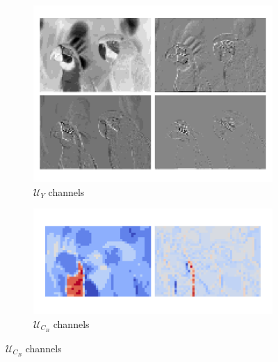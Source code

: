 \begin{figure}[t]
    \centering
    \begin{minipage}{0.41\textwidth}
        \begin{subfigure}{\textwidth}
            \centering
            \includegraphics[width=.95\textwidth]{figures/kodim23_Y_components.pdf}
            \vspace{-13pt}
            \caption{$\bm{\mathcal{U}}_Y$ channels}
        \end{subfigure}%
    \end{minipage}
    \hspace{0.1cm} 
    \begin{minipage}{0.35\textwidth}
        \centering
        \begin{minipage}{\textwidth}
            \begin{subfigure}{\textwidth}
                \centering
                \includegraphics[width=.95\textwidth]{figures/kodim23_cb_components.pdf}
                \vspace{-15pt}
                \caption{$\bm{\mathcal{U}}_{C_B}$ channels}
            \end{subfigure}%

\end{minipage}
\end{minipage}
\end{figure}
